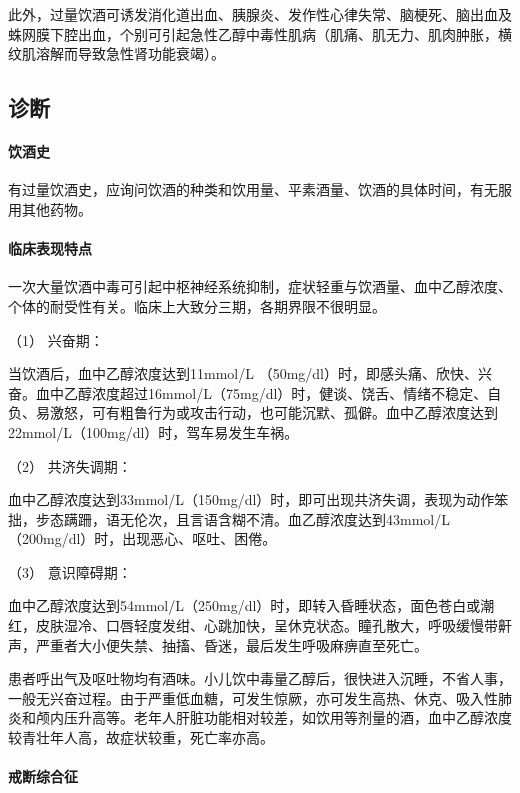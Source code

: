 此外，过量饮酒可诱发消化道出血、胰腺炎、发作性心律失常、脑梗死、脑出血及蛛网膜下腔出血，个别可引起急性乙醇中毒性肌病（肌痛、肌无力、肌肉肿胀，横纹肌溶解而导致急性肾功能衰竭）。

\subsection{诊断}

\paragraph{饮酒史}

有过量饮酒史，应询问饮酒的种类和饮用量、平素酒量、饮酒的具体时间，有无服用其他药物。

\paragraph{临床表现特点}

一次大量饮酒中毒可引起中枢神经系统抑制，症状轻重与饮酒量、血中乙醇浓度、个体的耐受性有关。临床上大致分三期，各期界限不很明显。

\hypertarget{text00151.htmlux5cux23CHP5-5-1-2-2-1}{}
（1） 兴奋期：

当饮酒后，血中乙醇浓度达到11mmol/L
（50mg/dl）时，即感头痛、欣快、兴奋。血中乙醇浓度超过16mmol/L（75mg/dl）时，健谈、饶舌、情绪不稳定、自负、易激怒，可有粗鲁行为或攻击行动，也可能沉默、孤僻。血中乙醇浓度达到22mmol/L（100mg/dl）时，驾车易发生车祸。

\hypertarget{text00151.htmlux5cux23CHP5-5-1-2-2-2}{}
（2） 共济失调期：

血中乙醇浓度达到33mmol/L（150mg/dl）时，即可出现共济失调，表现为动作笨拙，步态蹒跚，语无伦次，且言语含糊不清。血乙醇浓度达到43mmol/L（200mg/dl）时，出现恶心、呕吐、困倦。

\hypertarget{text00151.htmlux5cux23CHP5-5-1-2-2-3}{}
（3） 意识障碍期：

血中乙醇浓度达到54mmol/L（250mg/dl）时，即转入昏睡状态，面色苍白或潮红，皮肤湿冷、口唇轻度发绀、心跳加快，呈休克状态。瞳孔散大，呼吸缓慢带鼾声，严重者大小便失禁、抽搐、昏迷，最后发生呼吸麻痹直至死亡。

患者呼出气及呕吐物均有酒味。小儿饮中毒量乙醇后，很快进入沉睡，不省人事，一般无兴奋过程。由于严重低血糖，可发生惊厥，亦可发生高热、休克、吸入性肺炎和颅内压升高等。老年人肝脏功能相对较差，如饮用等剂量的酒，血中乙醇浓度较青壮年人高，故症状较重，死亡率亦高。

\paragraph{戒断综合征}

